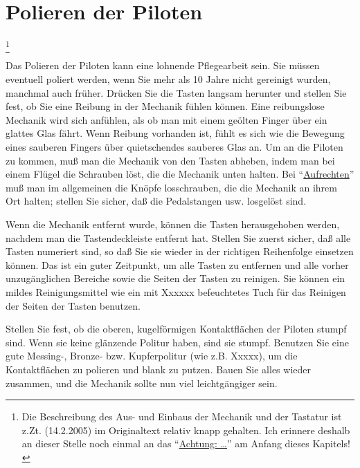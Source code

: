 \hypertarget{c2_7b}{}
\section{Polieren der Piloten}
\label{c2_7_pilo} 

\footnote{Die Beschreibung des  Aus- und Einbaus der Mechanik und der Tastatur ist z.Zt. (14.2.2005) im Originaltext relativ knapp gehalten.
Ich erinnere deshalb an dieser Stelle noch einmal an das \enquote{\hyperref[c2_1]{Achtung: \dots}} am Anfang dieses Kapitels!}

Das Polieren der Piloten kann eine lohnende Pflegearbeit sein.
Sie müssen eventuell poliert werden, wenn Sie mehr als 10 Jahre nicht gereinigt wurden, manchmal auch früher.
Drücken Sie die Tasten langsam herunter und stellen Sie fest, ob Sie eine Reibung in der Mechanik fühlen können.
Eine reibungslose Mechanik wird sich anfühlen, als ob man mit einem geölten Finger über ein glattes Glas fährt.
Wenn Reibung vorhanden ist, fühlt es sich wie die Bewegung eines sauberen Fingers über quietschendes sauberes Glas an.
Um an die Piloten zu kommen, muß man die Mechanik von den Tasten abheben, indem man bei einem Flügel die Schrauben löst, die die Mechanik unten halten.
Bei \enquote{\hyperref[upright]{Aufrechten}} muß man im allgemeinen die Knöpfe losschrauben, die die Mechanik an ihrem Ort halten; stellen Sie sicher, daß die Pedalstangen usw. losgelöst sind.

Wenn die Mechanik entfernt wurde, können die Tasten herausgehoben werden, nachdem man die Tastendeckleiste entfernt hat.
Stellen Sie zuerst sicher, daß alle Tasten numeriert sind, so daß Sie sie wieder in der richtigen Reihenfolge einsetzen können.
Das ist ein guter Zeitpunkt, um alle Tasten zu entfernen und alle vorher unzugänglichen Bereiche sowie die Seiten der Tasten zu reinigen.
Sie können ein mildes Reinigungsmittel wie ein mit Xxxxxx befeuchtetes Tuch für das Reinigen der Seiten der Tasten benutzen.

Stellen Sie fest, ob die oberen, kugelförmigen Kontaktflächen der Piloten stumpf sind.
Wenn sie keine glänzende Politur haben, sind sie stumpf.
Benutzen Sie eine gute Messing-, Bronze- bzw. Kupferpolitur (wie z.B. Xxxxx), um die Kontaktflächen zu polieren und blank zu putzen.
Bauen Sie alles wieder zusammen, und die Mechanik sollte nun viel leichtgängiger sein.
 




